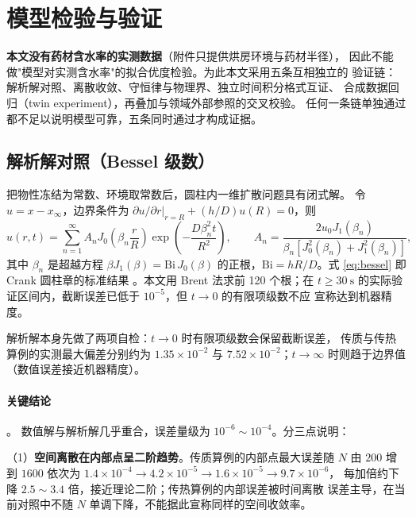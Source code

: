 \section{模型检验与验证}

\textbf{本文没有药材含水率的实测数据}（附件只提供烘房环境与药材半径），
因此不能做"模型对实测含水率"的拟合优度检验。为此本文采用五条互相独立的
验证链：解析解对照、离散收敛、守恒律与物理界、独立时间积分格式互证、
合成数据回归（twin experiment），再叠加与领域外部参照的交叉校验。
任何一条链单独通过都不足以说明模型可靠，五条同时通过才构成证据。

\subsection{解析解对照（Bessel 级数）}

把物性冻结为常数、环境取常数后，圆柱内一维扩散问题具有闭式解。
令 $u=x-x_\infty$，边界条件为
$\partial u/\partial r|_{r=R}+(h/D)u(R)=0$，则
\begin{equation}
u(r,t)=\sum_{n=1}^{\infty}A_nJ_0\!\left(\beta_n\frac{r}{R}\right)
\exp\!\left(-\frac{D\beta_n^2t}{R^2}\right),\qquad
A_n=\frac{2u_0J_1(\beta_n)}{\beta_n\left[J_0^2(\beta_n)+J_1^2(\beta_n)\right]},
\label{eq:bessel}
\end{equation}
其中 $\beta_n$ 是超越方程 $\beta J_1(\beta)=\mathrm{Bi}\,J_0(\beta)$
的正根，$\mathrm{Bi}=hR/D$。式 \eqref{eq:bessel} 即 Crank 圆柱章的标准结果
\cite{crank,carslaw}。本文用 Brent 法求前 120 个根；在 $t\ge30\ \mathrm{s}$
的实际验证区间内，截断误差已低于 $10^{-5}$，但 $t\to0$ 的有限项级数不应
宣称达到机器精度。

解析解本身先做了两项自检：$t\to0$ 时有限项级数会保留截断误差，
传质与传热算例的实测最大偏差分别约为 $1.35\times10^{-2}$ 与
$7.52\times10^{-2}$；$t\to\infty$ 时则趋于边界值（数值误差接近机器精度）。



\paragraph{关键结论}。
数值解与解析解几乎重合，误差量级为 $10^{-6}\sim10^{-4}$。分三点说明：

（1）\textbf{空间离散在内部点呈二阶趋势}。传质算例的内部点最大误差随 $N$ 由 $200$ 增到
$1600$ 依次为 $1.4\times10^{-4}\to4.2\times10^{-5}\to1.6\times10^{-5}\to9.7\times10^{-6}$，
每加倍约下降 $2.5\sim3.4$ 倍，接近理论二阶；传热算例的内部误差被时间离散
误差主导，在当前对照中不随 $N$ 单调下降，不能据此宣称同样的空间收敛率。

